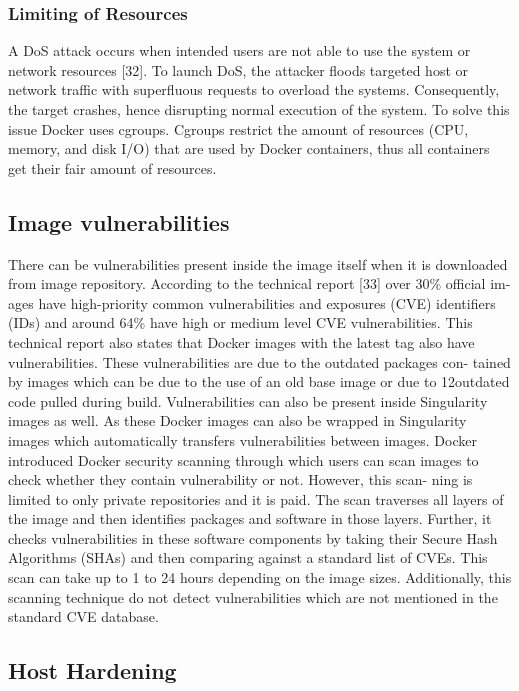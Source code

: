 \documentclass[a4paper,num-refs]{oup-contemporary}
\begin{document}
\subsubsection{Limiting of Resources}

A DoS attack occurs when intended users are not able to use the system or
network resources [32]. To launch DoS, the attacker floods targeted host or
network traffic with superfluous requests to overload the systems. Consequently,
the target crashes, hence disrupting normal execution of the system. To solve
this issue Docker uses cgroups. Cgroups restrict the amount of resources (CPU,
memory, and disk I/O) that are used by Docker containers, thus all containers
get their fair amount of resources.

\subsection{Image vulnerabilities}

There can be vulnerabilities present inside the image itself when it is downloaded
from image repository. According to the technical report [33] over 30\% official im-
ages have high-priority common vulnerabilities and exposures (CVE) identifiers
(IDs) and around 64\% have high or medium level CVE vulnerabilities. This
technical report also states that Docker images with the latest tag also have
vulnerabilities. These vulnerabilities are due to the outdated packages con-
tained by images which can be due to the use of an old base image or due to
12outdated code pulled during build. Vulnerabilities can also be present 
inside Singularity images as well. As these Docker images can also be
wrapped in Singularity images which automatically transfers vulnerabilities
between images.
Docker introduced Docker security scanning through which users can scan
images to check whether they contain vulnerability or not. However, this scan-
ning is limited to only private repositories and it is paid. The scan traverses
all layers of the image and then identifies packages and software in those layers.
Further, it checks vulnerabilities in these software components by taking their
Secure Hash Algorithms (SHAs) and then comparing against a standard list of
CVEs. This scan can take up to 1 to 24 hours depending on the image sizes.
Additionally, this scanning technique do not detect vulnerabilities which are not
mentioned in the standard CVE database.

\subsection{Host Hardening}
\end{document}
